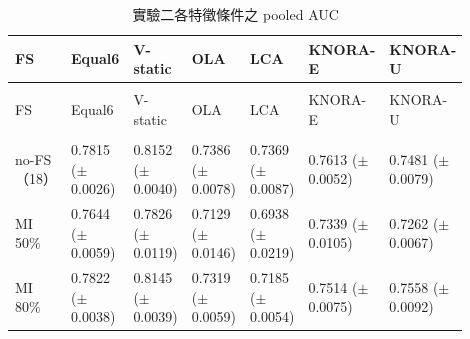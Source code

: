 \begingroup
\small{}\setlength{\tabcolsep}{3pt}
\setlength{\LTleft}{\fill}\setlength{\LTright}{\fill}
\begin{longtable}{@{}>{\raggedright\arraybackslash}p{0.16\linewidth}>{\raggedright\arraybackslash}p{0.123\linewidth}>{\raggedright\arraybackslash}p{0.123\linewidth}>{\raggedright\arraybackslash}p{0.123\linewidth}>{\raggedright\arraybackslash}p{0.123\linewidth}>{\raggedright\arraybackslash}p{0.123\linewidth}>{\raggedright\arraybackslash}p{0.123\linewidth}@{}}
\caption{實驗二各特徵條件之 pooled AUC}\label{tab:results-fs-auc}\\
\toprule
FS & Equal6 & V-static & OLA & LCA & KNORA-E & KNORA-U \\
\midrule\endfirsthead
\multicolumn{7}{c}{表~\thetable（續）}\\
\toprule
FS & Equal6 & V-static & OLA & LCA & KNORA-E & KNORA-U \\
\midrule\endhead
\midrule\multicolumn{7}{r}{續下頁}\\\endfoot
\bottomrule\endlastfoot
no-FS（18） & \shortstack[l]{0.7815\\{\scriptsize(\(\pm\)0.0026)}} & \shortstack[l]{0.8152\\{\scriptsize(\(\pm\)0.0040)}} & \shortstack[l]{0.7386\\{\scriptsize(\(\pm\)0.0078)}} & \shortstack[l]{0.7369\\{\scriptsize(\(\pm\)0.0087)}} & \shortstack[l]{0.7613\\{\scriptsize(\(\pm\)0.0052)}} & \shortstack[l]{0.7481\\{\scriptsize(\(\pm\)0.0079)}} \\
MI 50\% & \shortstack[l]{0.7644\\{\scriptsize(\(\pm\)0.0059)}} & \shortstack[l]{0.7826\\{\scriptsize(\(\pm\)0.0119)}} & \shortstack[l]{0.7129\\{\scriptsize(\(\pm\)0.0146)}} & \shortstack[l]{0.6938\\{\scriptsize(\(\pm\)0.0219)}} & \shortstack[l]{0.7339\\{\scriptsize(\(\pm\)0.0105)}} & \shortstack[l]{0.7262\\{\scriptsize(\(\pm\)0.0067)}} \\
MI 80\% & \shortstack[l]{0.7822\\{\scriptsize(\(\pm\)0.0038)}} & \shortstack[l]{0.8145\\{\scriptsize(\(\pm\)0.0039)}} & \shortstack[l]{0.7319\\{\scriptsize(\(\pm\)0.0059)}} & \shortstack[l]{0.7185\\{\scriptsize(\(\pm\)0.0054)}} & \shortstack[l]{0.7514\\{\scriptsize(\(\pm\)0.0075)}} & \shortstack[l]{0.7558\\{\scriptsize(\(\pm\)0.0092)}} \\

\end{longtable}
